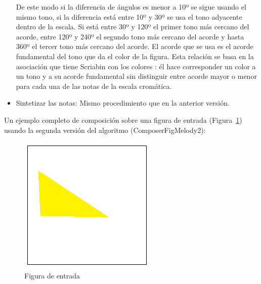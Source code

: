 \begin{itemize}
De este modo si la diferencia de ángulos es menor a 10º se sigue usando el mismo tono, si la diferencia está entre 10º y 30º se usa el tono adyacente dentro de la escala. Si está entre 30º y 120º el primer tono más cercano del acorde, entre 120º y 240º el segundo tono más cercano del acorde y hasta 360º el tercer tono más cercano del acorde. El acorde que se usa es el acorde fundamental del tono que da el color de la figura. Esta relación se basa en la asociación que tiene Scriabin con los colores \cite{ScriabinQuintasColor}: él hace corresponder un color a un tono y a su acorde fundamental sin distinguir entre acorde mayor o menor para cada una de las notas de la escala cromática.

	\item Sintetizar las notas: Mismo procedimiento que en la anterior versión.

\end{itemize}

Un ejemplo completo de composición sobre una figura de entrada (Figura~\ref{fig:Figura0Voz1}) usando la segunda versión del algoritmo (ComposerFigMelody2): \\

		\begin{figure}[!htbp]
		\centering
		\hspace*{0.0in}
		\includegraphics[scale=1.0]{graphics/simpletest1.png}
		\caption{Figura de entrada}
		\label{fig:Figura0Voz1}
		\end{figure}

